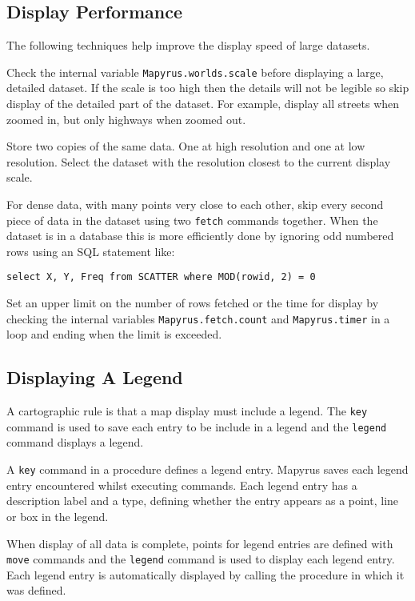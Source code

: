 \subsection{Display Performance}

The following techniques help improve the display speed of large datasets.

Check the internal variable \texttt{Mapyrus.worlds.scale} before displaying a
large, detailed dataset.  If the scale is too high then the details will not be
legible so skip display of the detailed part of the dataset.  For example,
display all streets when zoomed in, but only highways when zoomed out.

Store two copies of the same data.  One at high resolution and one at low
resolution.  Select the dataset with the resolution closest to the current
display scale.

For dense data, with many points very close to each other, skip every second
piece of data in the dataset using two \texttt{fetch} commands together.  When
the dataset is in a database this is more efficiently done by ignoring odd
numbered rows using an SQL statement like:

\begin{verbatim}
select X, Y, Freq from SCATTER where MOD(rowid, 2) = 0
\end{verbatim}

Set an upper limit on the number of rows fetched or the time for display by
checking the internal variables \texttt{Mapyrus.fetch.count} and
\texttt{Mapyrus.timer} in a loop and ending when the limit is exceeded.

\subsection{Displaying A Legend}

A cartographic rule is that a map display must include a legend.  The
\texttt{key} command is used to save each entry to be include in a legend and
the \texttt{legend} command displays a legend.

A \texttt{key} command in a procedure defines a legend entry.  Mapyrus saves
each legend entry encountered whilst executing commands.  Each legend entry has
a description label and a type, defining whether the entry appears as a point,
line or box in the legend.

When display of all data is complete, points for legend entries are defined
with \texttt{move} commands and the \texttt{legend} command is used to display
each legend entry.  Each legend entry is automatically displayed by calling the
procedure in which it was defined.

